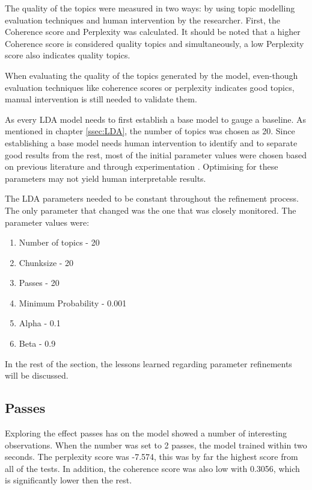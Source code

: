 The quality of the topics were measured in two ways: by using topic modelling evaluation techniques and human intervention by the researcher. First, the Coherence score and Perplexity was calculated. It should be noted that a higher Coherence score is considered quality topics and simultaneously, a low Perplexity score also indicates quality topics.

\begin{lesson}
When evaluating the quality of the topics generated by the model, even-though evaluation techniques like coherence scores or perplexity indicates good topics, manual intervention is still needed to validate them.
\end{lesson}\label{L:manual}

As every LDA model needs to first establish a base model to gauge a baseline. As mentioned in chapter \ref{ssec:LDA}, the number of topics was chosen as 20. Since establishing a base model needs human intervention to identify and to separate good results from the rest, most of the initial parameter values were chosen based on previous literature and through experimentation \cite{baghel2010frequent}. Optimising for these parameters may not yield human interpretable results.

The LDA parameters needed to be constant throughout the refinement process. The only parameter that changed was the one that was closely monitored.
The parameter values were:
\begin{enumerate}
    \item Number of topics - 20
    \item Chunksize - 20
    \item Passes - 20
    \item Minimum Probability - 0.001
    \item Alpha - 0.1
    \item Beta - 0.9
\end{enumerate}

In the rest of the section, the lessons learned regarding parameter refinements will be discussed. 

\subsection{Passes}
Exploring the effect passes has on the model showed a number of interesting observations. When the number was set to 2 passes, the model trained within two seconds. The perplexity score was -7.574, this was by far the highest score from all of the tests. In addition, the coherence score was also low with 0.3056, which is significantly lower then the rest.

